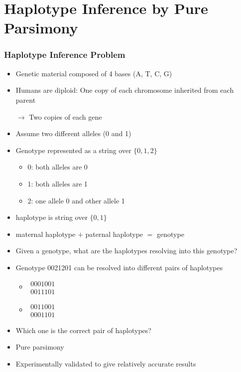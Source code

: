 \documentclass[handout]{beamer}
\begin{document}
\section{Haplotype Inference by Pure Parsimony}
\begin{frame}
\frametitle{Haplotype Inference Problem}
\begin{itemize}
\item Genetic material composed of 4 bases (A, T, C, G)
\item Humans are diploid: One copy of each chromosome inherited from each parent
\item[$\rightarrow$] Two copies of each gene
\item Assume two different alleles (0 and 1)
\item Genotype represented as a string over $\{0,1,2\}$
\begin{itemize}
\item 0: both alleles are 0
\item 1: both alleles are 1
\item 2: one allele 0 and other allele 1
\end{itemize}
\item haplotype is string over $\{0,1\}$
\item maternal haplotype $+$ paternal haplotype $=$ genotype
\end{itemize}
\end{frame}

\begin{frame}
\begin{itemize}
\item Given a genotype, what are the haplotypes resolving into this genotype?
\item Genotype 0021201 can be resolved into different pairs of haplotypes
\begin{itemize}
\item $\begin{matrix}
0001001  \\\hline
0011101 
\end{matrix}$
\item $\begin{matrix}
0011001 \\\hline
0001101 
\end{matrix}$
\end{itemize}
\item Which one is the correct pair of haplotypes?
\item Pure parsimony
\item Experimentally validated to give relatively accurate results~\cite{DBLP:journals/bioinformatics/WangX03a}
\end{itemize}
\end{frame}
\end{document}
